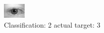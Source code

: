 \begin{figure}[h!]
\begin{center}
\includegraphics[width=0.60\columnwidth]{figures/ID558_class_2_target_3.png}
\end{center}
\caption{ Classification: 2 actual target: 3}
\label{fig:ID558_class_2_target_3}
\end{figure}
